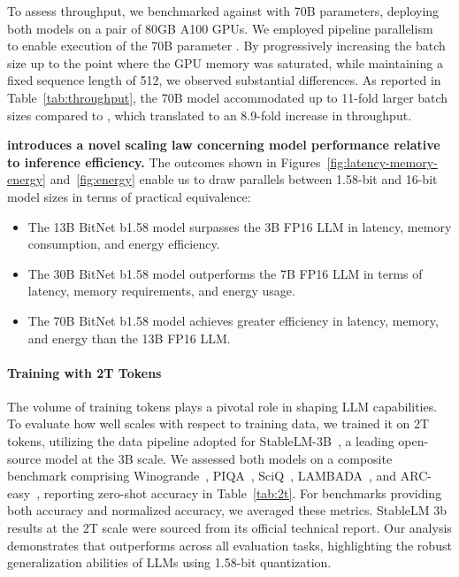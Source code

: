 To assess throughput, we benchmarked  against  with 70B parameters, deploying both models on a pair of 80GB A100 GPUs. We employed pipeline parallelism~\cite{gpipe} to enable execution of the 70B parameter . By progressively increasing the batch size up to the point where the GPU memory was saturated, while maintaining a fixed sequence length of 512, we observed substantial differences. As reported in Table~\ref{tab:throughput}, the 70B  model accommodated up to 11-fold larger batch sizes compared to , which translated to an 8.9-fold increase in throughput.

\textbf{ introduces a novel scaling law concerning model performance relative to inference efficiency.} The outcomes shown in Figures~\ref{fig:latency-memory-energy} and~\ref{fig:energy} enable us to draw parallels between 1.58-bit and 16-bit model sizes in terms of practical equivalence:

\begin{itemize}
    \item The 13B BitNet b1.58 model surpasses the 3B FP16 LLM in latency, memory consumption, and energy efficiency.
    \item The 30B BitNet b1.58 model outperforms the 7B FP16 LLM in terms of latency, memory requirements, and energy usage.
    \item The 70B BitNet b1.58 model achieves greater efficiency in latency, memory, and energy than the 13B FP16 LLM.
\end{itemize}

\paragraph{Training with 2T Tokens}

The volume of training tokens plays a pivotal role in shaping LLM capabilities. To evaluate how well  scales with respect to training data, we trained it on 2T tokens, utilizing the data pipeline adopted for StableLM-3B~\cite{StableLM-3B-4E1T}, a leading open-source model at the 3B scale. We assessed both models on a composite benchmark comprising Winogrande~\cite{winoGrande}, PIQA~\cite{piqa}, SciQ~\cite{sciq}, LAMBADA~\cite{lambada}, and ARC-easy~\cite{arc}, reporting zero-shot accuracy in Table~\ref{tab:2t}. For benchmarks providing both accuracy and normalized accuracy, we averaged these metrics. StableLM 3b results at the 2T scale were sourced from its official technical report. Our analysis demonstrates that  outperforms across all evaluation tasks, highlighting the robust generalization abilities of LLMs using 1.58-bit quantization.

